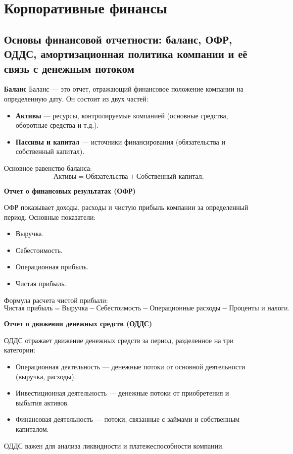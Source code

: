 \section{Корпоративные финансы}

\subsection{Основы финансовой отчетности: баланс, ОФР, ОДДС, амортизационная политика компании и её связь с денежным потоком}

\textbf{Баланс}
Баланс --- это отчет, отражающий финансовое положение компании на определенную дату. Он состоит из двух частей:
\begin{itemize}
    \item \textbf{Активы} --- ресурсы, контролируемые компанией (основные средства, оборотные средства и т.д.).
    \item \textbf{Пассивы и капитал} --- источники финансирования (обязательства и собственный капитал).
\end{itemize}
Основное равенство баланса: 
\begin{equation}
    \text{Активы} = \text{Обязательства} + \text{Собственный капитал}.
\end{equation}

\textbf{Отчет о финансовых результатах (ОФР)}

ОФР показывает доходы, расходы и чистую прибыль компании за определенный период. Основные показатели:
\begin{itemize}
    \item Выручка.
    \item Себестоимость.
    \item Операционная прибыль.
    \item Чистая прибыль.
\end{itemize}

Формула расчета чистой прибыли:
\begin{equation}
    \text{Чистая прибыль} = \text{Выручка} - \text{Себестоимость} - \text{Операционные расходы} - \text{Проценты и налоги}.
\end{equation}


\textbf{Отчет о движении денежных средств (ОДДС)}

ОДДС отражает движение денежных средств за период, разделенное на три категории:
\begin{itemize}
    \item Операционная деятельность --- денежные потоки от основной деятельности (выручка, расходы).
    \item Инвестиционная деятельность --- денежные потоки от приобретения и выбытия активов.
    \item Финансовая деятельность --- потоки, связанные с займами и собственным капиталом.
\end{itemize}
ОДДС важен для анализа ликвидности и платежеспособности компании.

